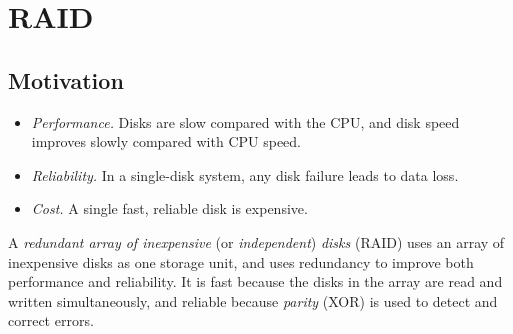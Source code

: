 \section{RAID}
\label{sec:raid}

\newcommand{\raidstrip}[2]{%
  \foreach \i in {1,...,#2} {
    \pgfmathtruncatemacro{\b}{\i-1}\pgfmathtruncatemacro{\c}{mod(\b,8)}
    \node[fill=rb\c, font=\scriptsize, minimum size=4mm, inner sep=0pt] at (#1+0.47*\b,0.95) {\b};
  }}
\newcommand{\raiddisk}[4]{%
  \pic at (#1,0) {hdd={\scriptsize #2}{0.6}{#3}{0.17}};
  \foreach \f/\t/\c [count=\k] in {#4}
    \node[fill=\f, text=\c, font=\scriptsize, minimum width=4.6mm, minimum height=3.4mm, inner sep=0.8pt] at (#1,{-0.01-0.34*\k}) {\t};}

\subsection{Motivation}

\begin{itemize}
  \item \emph{Performance.} Disks are slow compared with the CPU, and disk speed improves slowly compared with CPU speed.
  \item \emph{Reliability.} In a single-disk system, any disk failure leads to data loss.
  \item \emph{Cost.} A single fast, reliable disk is expensive.
\end{itemize}

\begin{definition}[RAID]
  A \emph{redundant array of inexpensive} (or \emph{independent}) \emph{disks} (RAID) uses an array of inexpensive disks as one storage unit, and uses redundancy to improve both performance and reliability. It is fast because the disks in the array are read and written simultaneously, and reliable because \emph{parity} (XOR) is used to detect and correct errors.
\end{definition}

